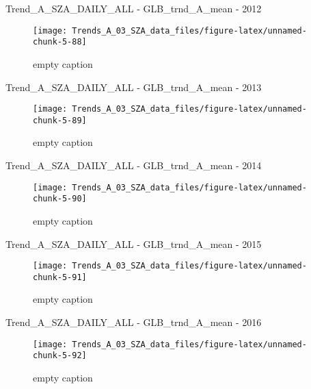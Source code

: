 \documentclass[
  10pt,
  a4paper,oneside]{article}
\begin{document}
Trend\_A\_SZA\_DAILY\_ALL - GLB\_trnd\_A\_mean - 2012

\begin{figure}[!ht]

{\centering \texttt{[image: Trends\_A\_03\_SZA\_data\_files/figure-latex/unnamed-chunk-5-88]} 

}

\caption{ empty caption }\label{fig:unnamed-chunk-5-88}
\end{figure}

Trend\_A\_SZA\_DAILY\_ALL - GLB\_trnd\_A\_mean - 2013

\begin{figure}[!ht]

{\centering \texttt{[image: Trends\_A\_03\_SZA\_data\_files/figure-latex/unnamed-chunk-5-89]} 

}

\caption{ empty caption }\label{fig:unnamed-chunk-5-89}
\end{figure}

Trend\_A\_SZA\_DAILY\_ALL - GLB\_trnd\_A\_mean - 2014

\begin{figure}[!ht]

{\centering \texttt{[image: Trends\_A\_03\_SZA\_data\_files/figure-latex/unnamed-chunk-5-90]} 

}

\caption{ empty caption }\label{fig:unnamed-chunk-5-90}
\end{figure}

Trend\_A\_SZA\_DAILY\_ALL - GLB\_trnd\_A\_mean - 2015

\begin{figure}[!ht]

{\centering \texttt{[image: Trends\_A\_03\_SZA\_data\_files/figure-latex/unnamed-chunk-5-91]} 

}

\caption{ empty caption }\label{fig:unnamed-chunk-5-91}
\end{figure}

Trend\_A\_SZA\_DAILY\_ALL - GLB\_trnd\_A\_mean - 2016

\begin{figure}[!ht]

{\centering \texttt{[image: Trends\_A\_03\_SZA\_data\_files/figure-latex/unnamed-chunk-5-92]} 

}

\caption{ empty caption }\label{fig:unnamed-chunk-5-92}
\end{figure}
\end{document}
